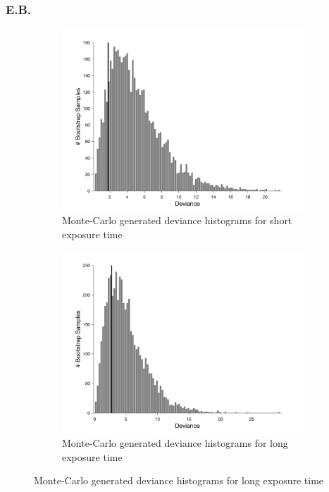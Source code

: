 \documentclass{article}
\begin{document}
\subsubsection*{E.B.}
\begin{figure}[!hb]
    \begin{subfigure}{0.494\textwidth}
        \centering
        \includegraphics[width = \linewidth]{Thesis/plots/gof/cutNo/cutNo_eb_short_bootstrap.png}
        \caption{Monte-Carlo generated deviance histograms for short exposure time}
        \label{fig:da_gof_short_bootstrap}
    \end{subfigure}
    \hspace{0.01\textwidth}
    \begin{subfigure}{0.494\textwidth}
        \centering
        \includegraphics[width = \linewidth]{Thesis/plots/gof/cutNo/cutNo_eb_long_bootstrap.png}
        \caption{Monte-Carlo generated deviance histograms for long exposure time}
        \label{fig:da_gof_long_bootstrap}
    \end{subfigure}
    

\end{figure}
\end{document}
